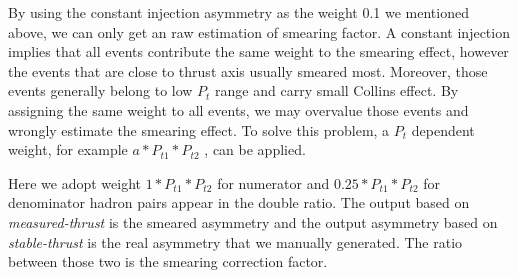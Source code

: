  By using the constant injection asymmetry as the weight 0.1 we mentioned above, we can only get an raw estimation of smearing factor. A constant injection implies that all events contribute the same weight to the smearing effect, however the events that are close to thrust axis usually smeared most. Moreover, those events generally belong to low $P_t$ range and carry small Collins effect. By assigning the same weight to all events, we may overvalue those events and wrongly estimate the smearing effect. To solve this problem, a $P_t$ dependent weight,  for example $a*P_{t1}*P_{t2}$ , can be applied. 
 
 Here we adopt weight $1*P_{t1}*P_{t2}$ for numerator and $0.25*P_{t1}*P_{t2}$ for denominator hadron pairs appear in the double ratio. The output based on {\em measured-thrust} is the smeared asymmetry and the output asymmetry based on {\em stable-thrust} is the real asymmetry that we manually generated. The ratio between those two is the smearing correction factor.
 

